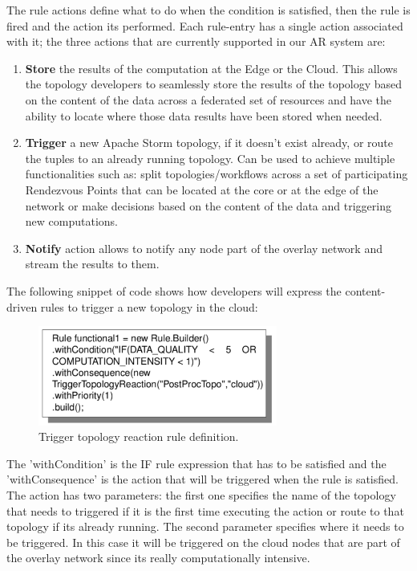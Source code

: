 The rule actions define what to do when the condition is satisfied, then the rule is fired and the action its performed. Each rule-entry has a single action associated with it; the three actions that are currently supported in our AR system are:

\begin{enumerate}
  \item \textbf{Store} the results of the computation at the Edge or the Cloud. This allows the topology developers to seamlessly store the results of the topology based on the content of the data across a federated set of resources and have the ability to locate where those data results have been stored when needed.
  \item \textbf{Trigger} a new Apache Storm topology, if it doesn't exist already, or route the tuples to an already running topology. Can be used to achieve multiple functionalities such as: split topologies/workflows across a set of participating Rendezvous Points that can be located at the core or at the edge of the network or make decisions based on the content of the data and triggering new computations.
  \item \textbf{Notify} action allows to notify any node part of the overlay network and stream the results to them.
\end{enumerate}


The following snippet of code shows how developers will express the content-driven rules to trigger a new topology in the cloud:

\begin{figure}[h!]
  \centering
  \includegraphics[width=0.7\textwidth]{Figures/RuleTopology.pdf}
  \caption{Trigger topology reaction rule definition.}
  \label{fig:RuleTopology}
\end{figure}


The 'withCondition' is the IF rule expression that has to be satisfied and the 'withConsequence' is the action that will be triggered when the rule is satisfied. The action has two parameters: the first one specifies the name of the topology that needs to triggered if it is the first time executing the action or route to that topology if its already running. The second parameter specifies where it needs to be triggered. In this case it will be triggered on the cloud nodes that are part of the overlay network since its really computationally intensive. 

